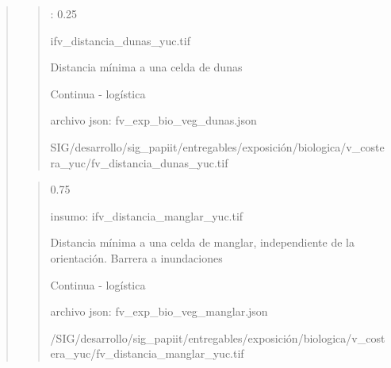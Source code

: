 \documentclass[letterpaper,10pt,spanish]{sphinxmanual}
\begin{document}

\begin{quote}


\begin{quote}

: 0.25

 ifv\_distancia\_dunas\_yuc.tif

 Distancia mínima a una celda de dunas


 Continua - logística

archivo json: fv\_exp\_bio\_veg\_dunas.json


\noindent{}

  SIG/desarrollo/sig\_papiit/entregables/exposición/biologica/v\_costera\_yuc/fv\_distancia\_dunas\_yuc.tif
\end{quote}


\begin{quote}

 0.75

insumo: ifv\_distancia\_manglar\_yuc.tif

 Distancia mínima a una celda de manglar, independiente de la orientación. Barrera a inundaciones

 Continua - logística

archivo json: fv\_exp\_bio\_veg\_manglar.json


\noindent{}

 /SIG/desarrollo/sig\_papiit/entregables/exposición/biologica/v\_costera\_yuc/fv\_distancia\_manglar\_yuc.tif
\end{quote}
\end{quote}
\end{document}
